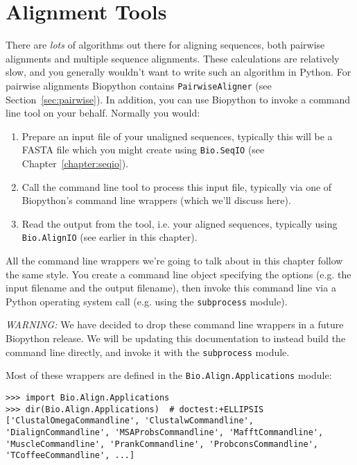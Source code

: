 \section{Alignment Tools}
\label{sec:alignment-tools}

There are \emph{lots} of algorithms out there for aligning sequences, both pairwise alignments
and multiple sequence alignments. These calculations are relatively slow, and you generally
wouldn't want to write such an algorithm in Python. For pairwise alignments Biopython contains \verb|PairwiseAligner| (see Section~\ref{sec:pairwise}). In addition,
you can use Biopython to invoke a command line tool on your behalf. Normally you would:
\begin{enumerate}
\item Prepare an input file of your unaligned sequences, typically this will be a FASTA file
      which you might create using \verb|Bio.SeqIO| (see Chapter~\ref{chapter:seqio}).
\item Call the command line tool to process this input file, typically via one of Biopython's
      command line wrappers (which we'll discuss here).
\item Read the output from the tool, i.e. your aligned sequences, typically using
      \verb|Bio.AlignIO| (see earlier in this chapter).
\end{enumerate}

All the command line wrappers we're going to talk about in this chapter follow the same style.
You create a command line object specifying the options (e.g. the input filename and the
output filename), then invoke this command line via a Python operating system call (e.g.
using the \texttt{subprocess} module).

\emph{WARNING:} We have decided to drop these command line wrappers in a future Biopython
release. We will be updating this documentation to instead build the command line
directly, and invoke it with the \texttt{subprocess} module.

Most of these wrappers are defined in the \verb|Bio.Align.Applications| module:

\begin{verbatim}
>>> import Bio.Align.Applications
>>> dir(Bio.Align.Applications)  # doctest:+ELLIPSIS
['ClustalOmegaCommandline', 'ClustalwCommandline', 'DialignCommandline', 'MSAProbsCommandline', 'MafftCommandline', 'MuscleCommandline', 'PrankCommandline', 'ProbconsCommandline', 'TCoffeeCommandline', ...]
\end{verbatim}

